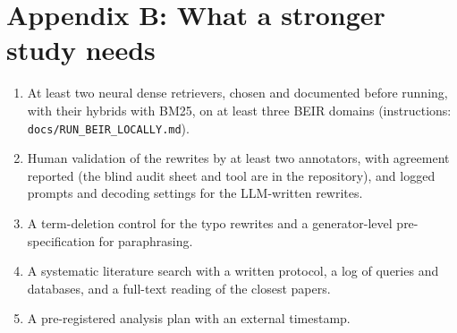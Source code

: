 \documentclass[
  11pt,
]{article}
\providecommand{\tightlist}{%
  \setlength{\itemsep}{0pt}\setlength{\parskip}{0pt}}
\begin{document}
\hypertarget{appendix-b-what-a-stronger-study-needs}{%
\section*{Appendix B: What a stronger study
needs}\label{appendix-b-what-a-stronger-study-needs}}

\begin{enumerate}
\def\labelenumi{\arabic{enumi}.}
\tightlist
\item
  At least two neural dense retrievers, chosen and documented before
  running, with their hybrids with BM25, on at least three BEIR domains
  (instructions: \texttt{docs/RUN\_BEIR\_LOCALLY.md}).
\item
  Human validation of the rewrites by at least two annotators, with
  agreement reported (the blind audit sheet and tool are in the
  repository), and logged prompts and decoding settings for the
  LLM-written rewrites.
\item
  A term-deletion control for the typo rewrites and a generator-level
  pre-specification for paraphrasing.
\item
  A systematic literature search with a written protocol, a log of
  queries and databases, and a full-text reading of the closest papers.
\item
  A pre-registered analysis plan with an external timestamp.
\end{enumerate}
\end{document}
